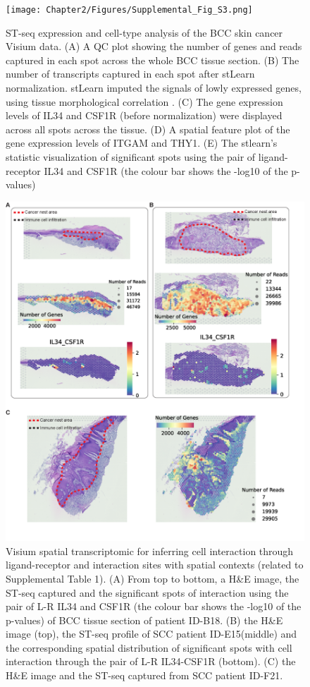 \begin{figure}[htp]
\renewcommand{\figurename}{Figure}
    \centering
    \texttt{[image: Chapter2/Figures/Supplemental\_Fig\_S3.png]}
    \caption[ST-seq expression and cell-type analysis of the BCC skin cancer Visium data.]{ST-seq expression and cell-type analysis of the BCC skin cancer Visium data. (A) A QC plot showing the number of genes and reads captured in each spot across the whole BCC tissue section. (B) The number of transcripts captured in each spot after stLearn normalization. stLearn imputed the signals of lowly expressed genes, using tissue morphological correlation \cite{pham2020stlearn}. (C) The gene expression levels of IL34 and CSF1R (before normalization) were displayed across all spots across the tissue. (D) A spatial feature plot of the gene expression levels of ITGAM and THY1. (E) The stlearn’s statistic visualization of significant spots using the pair of ligand-receptor IL34 and CSF1R (the colour bar shows the -log10 of the p-values)}
    \label{fig:Chap2_Supfigure3}
\end{figure}
\begin{figure}[htp]
\renewcommand{\figurename}{Figure}
    \centering
    \includegraphics[width=0.75\columnwidth]{Chapter2/Figures/Supplemental_Fig_S4.png}
    \caption[Visium spatial transcriptomic for inferring cell interaction through ligand-receptor and interaction sites with spatial contexts]{Visium spatial transcriptomic for inferring cell interaction through ligand-receptor and interaction sites with spatial contexts (related to Supplemental Table 1). (A) From top to bottom, a H\&E image, the ST-seq captured and the significant spots of interaction using the pair of L-R IL34 and CSF1R (the colour bar shows the -log10 of the p-values) of BCC tissue section of patient ID-B18. (B) the H\&E image (top), the ST-seq profile of SCC patient ID-E15(middle) and the corresponding spatial distribution of significant spots with cell interaction through the pair of L-R IL34-CSF1R (bottom). (C) the H\&E image and the ST-seq captured from SCC patient ID-F21. }
    \label{fig:Chap2_Supfigure4}
\end{figure}

